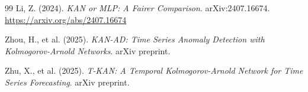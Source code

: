 \documentclass[11pt,a4paper,oneside]{report}
\theoremstyle{definition}
\theoremstyle{remark}
\begin{document}
\begin{thebibliography}{99}
Li, Z. (2024).
\textit{KAN or MLP: A Fairer Comparison}.
arXiv:2407.16674.
\url{https://arxiv.org/abs/2407.16674}

Zhou, H., et al. (2025).
\textit{KAN-AD: Time Series Anomaly Detection with Kolmogorov-Arnold Networks}.
arXiv preprint.

Zhu, X., et al. (2025).
\textit{T-KAN: A Temporal Kolmogorov-Arnold Network for Time Series Forecasting}.
arXiv preprint.

\end{thebibliography}
\end{document}
